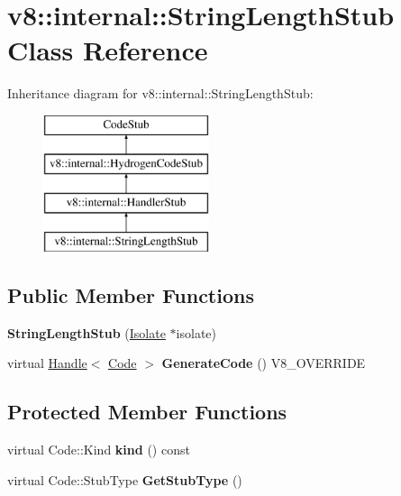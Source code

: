 \hypertarget{classv8_1_1internal_1_1_string_length_stub}{}\section{v8\+:\+:internal\+:\+:String\+Length\+Stub Class Reference}
\label{classv8_1_1internal_1_1_string_length_stub}
Inheritance diagram for v8\+:\+:internal\+:\+:String\+Length\+Stub\+:\begin{figure}[H]
\begin{center}
\leavevmode
\includegraphics[height=4.000000cm]{classv8_1_1internal_1_1_string_length_stub}
\end{center}
\end{figure}
\subsection*{Public Member Functions}
\begin{DoxyCompactItemize}
\item 
\hypertarget{classv8_1_1internal_1_1_string_length_stub_a3ef5cc106b81d62eb1633796380f45b9}{}{\bfseries String\+Length\+Stub} (\hyperlink{classv8_1_1internal_1_1_isolate}{Isolate} $\ast$isolate)\label{classv8_1_1internal_1_1_string_length_stub_a3ef5cc106b81d62eb1633796380f45b9}

\item 
\hypertarget{classv8_1_1internal_1_1_string_length_stub_aa4b88ff33a9f22fd542b991397237cf3}{}virtual \hyperlink{classv8_1_1internal_1_1_handle}{Handle}$<$ \hyperlink{classv8_1_1internal_1_1_code}{Code} $>$ {\bfseries Generate\+Code} () V8\+\_\+\+O\+V\+E\+R\+R\+I\+D\+E\label{classv8_1_1internal_1_1_string_length_stub_aa4b88ff33a9f22fd542b991397237cf3}

\end{DoxyCompactItemize}
\subsection*{Protected Member Functions}
\begin{DoxyCompactItemize}
\item 
\hypertarget{classv8_1_1internal_1_1_string_length_stub_aa370c9e05b24ba143197496304243104}{}virtual Code\+::\+Kind {\bfseries kind} () const \label{classv8_1_1internal_1_1_string_length_stub_aa370c9e05b24ba143197496304243104}

\item 
\hypertarget{classv8_1_1internal_1_1_string_length_stub_acb0fb17f1778e5c7810fceaa9070b6ec}{}virtual Code\+::\+Stub\+Type {\bfseries Get\+Stub\+Type} ()\label{classv8_1_1internal_1_1_string_length_stub_acb0fb17f1778e5c7810fceaa9070b6ec}

\end{DoxyCompactItemize}
